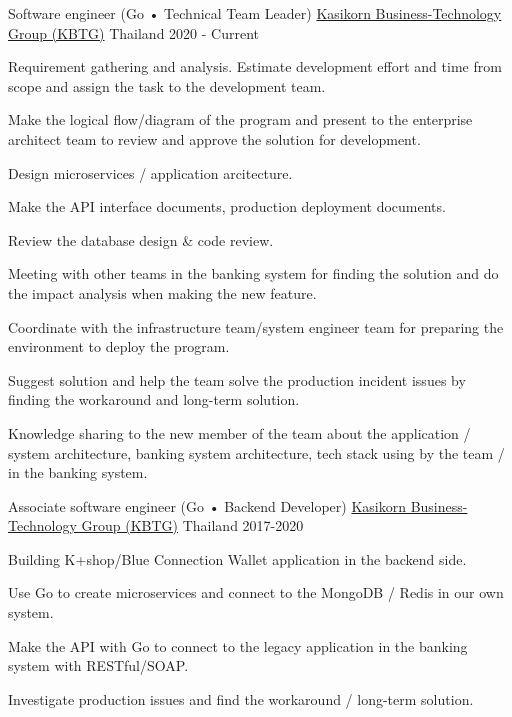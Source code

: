 
\begin{cventries}

  \cventry
    {Software engineer (Go • Technical Team Leader)}
    {\href{https://www.KBTG.tech}{Kasikorn Business-Technology Group (KBTG)}}
    {Thailand}
    {2020 - Current}
     {
      \begin{cvitems}
        \item {Requirement gathering and analysis. Estimate development effort and time from scope and assign the task to the development team.}
        \item {Make the logical flow/diagram of the program and present to the enterprise architect team to review and approve the solution for development.}
        \item {Design microservices / application arcitecture.}
        \item {Make the API interface documents, production deployment documents.}
        \item {Review the database design \& code review.}
        \item {Meeting with other teams in the banking system for finding the solution and do the impact analysis when making the new feature.}
        \item {Coordinate with the infrastructure team/system engineer team for preparing the environment to deploy the program.}
        \item {Suggest solution and help the team solve the production incident issues by finding the workaround and long-term solution.}
        \item {Knowledge sharing to the new member of the team about the application / system architecture, banking system architecture, tech stack using by the team / in the banking system.}
      \end{cvitems}
    }

  \cventry
    {Associate software engineer (Go • Backend Developer)}
    {\href{https://www.KBTG.tech}{Kasikorn Business-Technology Group (KBTG)}}
    {Thailand}
    {2017-2020}
     {
      \begin{cvitems}
        \item {Building K+shop/Blue Connection Wallet application in the backend side.}
        \item {Use Go to create microservices and connect to the MongoDB / Redis in our own system.}
        \item {Make the API with Go to connect to the legacy application in the banking system with RESTful/SOAP.}
        \item {Investigate production issues and find the workaround / long-term solution.}
      \end{cvitems}
    }

\end{cventries}
